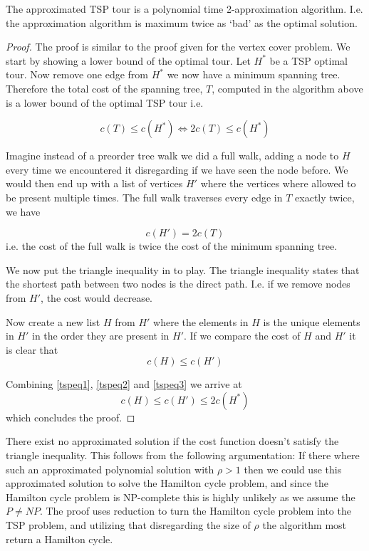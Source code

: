 \documentclass[10pt]{article}
\begin{document}
The approximated TSP tour is a polynomial time 2-approximation algorithm. I.e. the approximation algorithm is maximum twice as `bad' as the optimal solution.

\begin{proof}
The proof is similar to the proof given for the vertex cover problem. We start by showing a lower bound of the optimal tour. Let $H^*$ be a TSP optimal tour. Now remove one edge from $H^*$ we now have a minimum spanning tree. Therefore the total cost of the spanning tree, $T$, computed in the algorithm above is a lower bound of the optimal TSP tour i.e.

\begin{equation}
  c(T) \leq c(H^*) \Leftrightarrow 2c(T) \leq c(H^*) \label{tspeq1}
\end{equation}

Imagine instead of a preorder tree walk we did a full walk, adding a node to $H$ every time we encountered it disregarding if we have seen the node before. We would then end up with a list of vertices $H'$ where the vertices where allowed to be present multiple times. The full walk traverses every edge in $T$ exactly twice, we have

\begin{equation}
  c(H') = 2 c(T) \label{tspeq2}
\end{equation}
i.e. the cost of the full walk is twice the cost of the minimum spanning tree. 

We now put the triangle inequality in to play. The triangle inequality states that the shortest path between two nodes is the direct path. I.e. if we remove nodes from $H'$, the cost would decrease. 

Now create a new list $H$ from $H'$ where the elements in $H$ is the unique elements in $H'$ in the order they are present in $H'$. If we compare the cost of $H$ and $H'$ it is clear that 
\begin{equation}
  c(H) \leq c(H') \label{tspeq3}
\end{equation}

Combining \ref{tspeq1}, \ref{tspeq2} and \ref{tspeq3} we arrive at
\begin{equation}
  c(H) \leq c(H') \leq 2c(H^*)  
\end{equation}
which concludes the proof.

\end{proof}

There exist no approximated solution if the cost function doesn't satisfy the triangle inequality. This follows from the following argumentation: If there where such an approximated polynomial solution with $\rho>1$ then we could use this approximated solution to solve the Hamilton cycle problem, and since the Hamilton cycle problem is NP-complete this is highly unlikely as we assume the $P \neq NP$. The proof uses reduction to turn the Hamilton cycle problem into the TSP problem, and utilizing that disregarding the size of $\rho$ the algorithm most return a Hamilton cycle.
\end{document}
